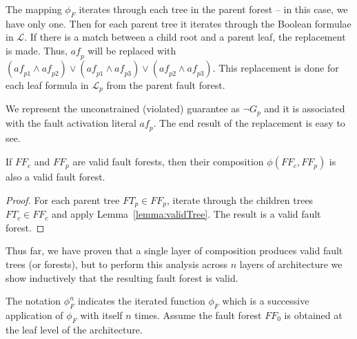The mapping $\phi_F$ iterates through each tree in the parent forest -- in this case, we have only one. Then for each parent tree it iterates through the Boolean formulae in $\mathcal{L}$. If there is a match between a child root and a parent leaf, the replacement is made.
Thus, $\mathit{af}_p$ will be replaced with $(\mathit{af}_{p1} \land \mathit{af}_{p2}) \lor (\mathit{af}_{p1} \land \mathit{af}_{p3}) \lor (\mathit{af}_{p2} \land \mathit{af}_{p3})$. This replacement is done for each leaf formula in $\mathcal{L}_p$ from the parent fault forest. 

We represent the unconstrained (violated) guarantee as $\neg G_p$ and it is associated with the fault activation literal $\mathit{af}_p$. The end result of the replacement is easy to see.

\begin{lemma} If $\mathit{FF}_c$ and $\mathit{FF}_p$ are valid fault forests, then their composition $\phi(\mathit{FF}_c, \mathit{FF}_p)$ is also a valid fault forest. 
\begin{proof}
For each parent tree $\mathit{FT}_p \in \mathit{FF}_p$, iterate through the children trees $\mathit{FT}_c \in \mathit{FF}_c$ and apply Lemma~\ref{lemma:validTree}. The result is a valid fault forest. 
\end{proof}
\label{lemma:validForest}
\end{lemma}

Thus far, we have proven that a single layer of composition produces valid fault trees (or forests), but to perform this analysis across $n$ layers of architecture we show inductively that the resulting fault forest is valid. 

The notation $\phi_F^n$ indicates the iterated function $\phi_F$ which is a successive application of $\phi_F$ with itself $n$ times. Assume the fault forest $\mathit{FF}_0$ is obtained at the leaf level of the architecture.


